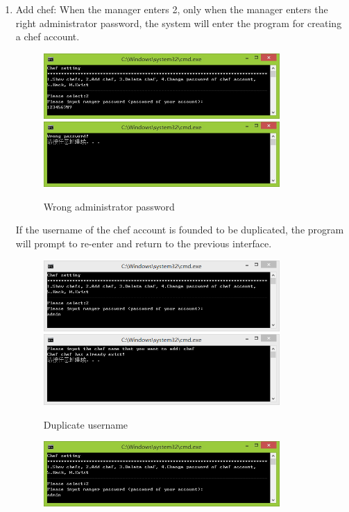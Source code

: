 \documentclass{article}
\begin{document}
\begin{enumerate}
    \item Add chef:\newline 
    When the manager enters 2, only when the manager enters the right administrator password, the system will enter the program for creating a chef account.
        \begin{figure}[H]
        \centering
        \includegraphics[width=0.85\textwidth]{B/B2a1.jpg}
        \includegraphics[width=0.85\textwidth]{B/B2a2.jpg}
        \caption{Wrong administrator password}
        \end{figure}
    \noindent
    If the username of the chef account is founded to be duplicated, the program will prompt to re-enter and return to the previous interface.
        \begin{figure}[H]
        \centering
        \includegraphics[width=0.85\textwidth]{B/B2c1.png}
        \includegraphics[width=0.85\textwidth]{B/B2c2.png}
        \caption{Duplicate username}
        \end{figure}
        \begin{figure}[H]
        \centering
        \includegraphics[width=0.85\textwidth]{B/B2b1.jpg}

\end{figure}
\end{enumerate}
\end{document}
